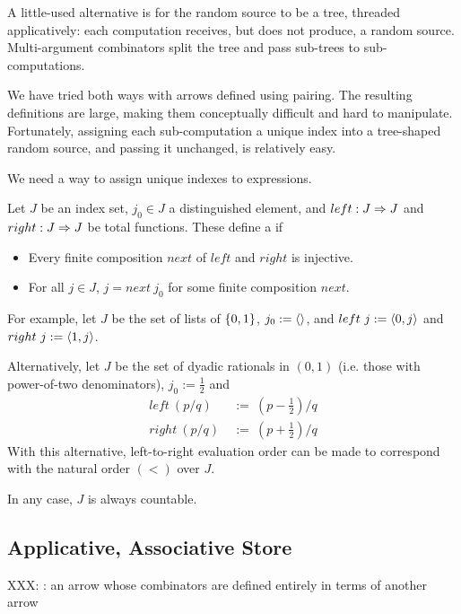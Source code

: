 \documentclass[preprint]{sigplanconf}
\begin{document}
A little-used alternative is for the random source to be a tree, threaded applicatively:
each computation receives, but does not produce, a random source.
Multi-argument combinators split the tree and pass sub-trees to sub-computations.

We have tried both ways with arrows defined using pairing.
The resulting definitions are large, making them conceptually difficult and hard to manipulate.
Fortunately, assigning each sub-computation a unique index into a tree-shaped random source, and passing it unchanged, is relatively easy.

We need a way to assign unique indexes to expressions.

\begin{definition}
Let $J$ be an index set, $j_0 \in J$ a distinguished element, and $left : J \Rightarrow J$ and $right : J \Rightarrow J$ be total functions.
These define a  if
\begin{itemize}
	\item Every finite composition $next$ of $left$ and $right$ is injective.
	\item For all $j \in J$, $j = next~j_0$ for some finite composition $next$.
\end{itemize}
\end{definition}

For example, let $J$ be the set of lists of $\{{0,1}\}$, $j_0 := \langle{}\rangle$, and $left~j := \langle{0,j}\rangle$ and $right~j := \langle{1,j}\rangle$.

Alternatively, let $J$ be the set of dyadic rationals in $(0,1)$ (i.e. those with power-of-two denominators), $j_0 := \tfrac{1}{2}$ and
\begin{equation}
\begin{aligned}
	left~(p/q) &\ := \ (p-\tfrac{1}{2})/q
\\
	right~(p/q) &\ := \ (p+\tfrac{1}{2})/q
\end{aligned}
\end{equation}
With this alternative, left-to-right evaluation order can be made to correspond with the natural order $(<)$ over $J$.

In any case, $J$ is always countable.

\subsection{Applicative, Associative Store}

XXX: : an arrow whose combinators are defined entirely in terms of another arrow
\end{document}
